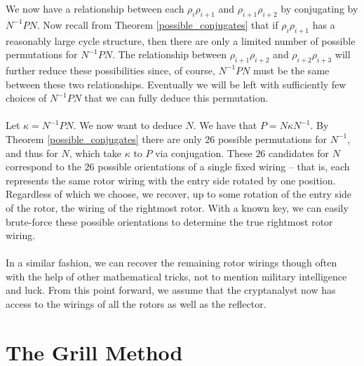 We now have a relationship between each $\rho_i\rho_{i+1}$ and
$\rho_{i+1}\rho_{i+2}$ by conjugating by $N^{-1}PN$. Now recall from
Theorem \ref{possible_conjugates} that if $\rho_i\rho_{i+1}$ has a
reasonably large
cycle structure, then there are only a limited number of possible
permutations for $N^{-1}PN$. The relationship between
$\rho_{i+1}\rho_{i+2}$ and $\rho_{i+2}\rho_{i+3}$ will further
reduce these possibilities since, of course, $N^{-1}PN$ must be the
same between these two relationships. Eventually we will be left with
sufficiently few choices of $N^{-1}PN$ that we can fully deduce this
permutation.
\\\\Let $\kappa = N^{-1}PN$. We now want to deduce $N$. We have that
$P = N\kappa N^{-1}$. By Theorem \ref{possible_conjugates} there are
only $26$ possible permutations for $N^{-1}$, and thus for $N$, which
take $\kappa$ to $P$ via conjugation. These $26$ candidates for $N$
correspond to the $26$ possible orientations of a single fixed wiring
-- that is, each represents the same rotor wiring with the entry side
rotated by one position. Regardless of which we choose, we recover,
up to some rotation of the entry side of the rotor, the wiring of the
rightmost rotor. With a known key, we can easily brute-force these
possible orientations to determine the true rightmost rotor wiring.
\\\\In a similar fashion, we can recover the remaining rotor wirings
though often with the help of other mathematical tricks, not to
mention military intelligence and luck. From this point forward, we
assume that the cryptanalyst now has access to the wirings of
all the rotors as well as the reflector.

\section{The Grill Method}

